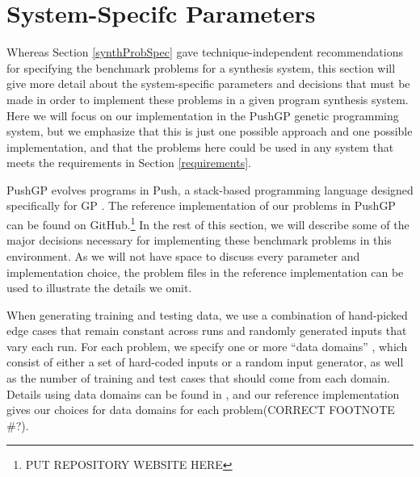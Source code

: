 \documentclass{sig-alternate}
\begin{document}
\section{System-Specifc Parameters} \label{systemParamsSection}

Whereas Section \ref{synthProbSpec} gave technique-independent recommendations for specifying the benchmark problems for a synthesis system, this section will give more detail about the system-specific parameters and decisions that must be made in order to implement these problems in a given program synthesis system. Here we will focus on our implementation in the PushGP genetic programming system, but we emphasize that this is just one possible approach and one possible implementation, and that the problems here could be used in any system that meets the requirements in Section \ref{requirements}.


PushGP evolves programs in Push, a stack-based programming language designed specifically for GP \cite{spector:2002:GPEM, 1068292}. %
The reference implementation of our problems in PushGP can be found on GitHub.\footnote{PUT REPOSITORY WEBSITE HERE} In the rest of this section, we will describe some of the major decisions necessary for implementing these benchmark problems in this environment. As we will not have space to discuss every parameter and implementation choice, the problem files in the reference implementation can be used to illustrate the details we omit.

When generating training and testing data, we use a combination of hand-picked edge cases that remain constant across runs and randomly generated inputs that vary each run. For each problem, we specify one or more ``data domains'' \cite{Helmuth:2014:GECCO}, which consist of either a set of hard-coded inputs or a random input generator, as well as the number of training and test cases that should come from each domain. Details using data domains can be found in \cite{Helmuth:2014:GECCO}, and our reference implementation gives our choices for data domains for each problem\footnotemark[2] (CORRECT FOOTNOTE \#?).
\end{document}
